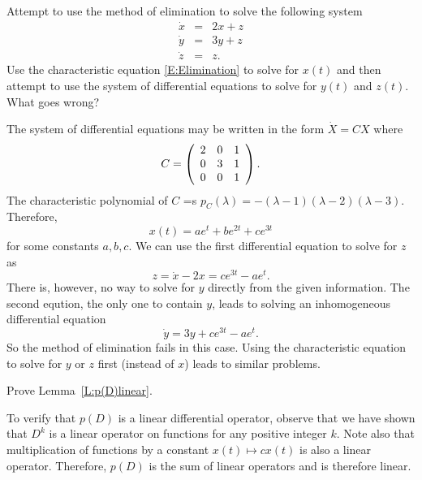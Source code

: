 \documentclass{ximera}
\begin{document}
\begin{exercise}  \label{c12.3.2}
Attempt to use the method of elimination to solve the following system
\[
\begin{array}{rcl}
\dot{x} & = & 2x + z\\
\dot{y} & = & 3y + z\\
\dot{z} & = & z.
\end{array}
\]
Use the characteristic equation \eqref{E:Elimination} to solve for $x(t)$ and 
then attempt to use the system of differential equations to solve for $y(t)$ 
and $z(t)$.  What goes wrong?

\begin{solution}

The system of differential equations may be written in the form $\dot{X}=CX$ where
\[
C=\left(\begin{array}{rrr} 2 & 0 & 1 \\ 0 & 3 & 1 \\ 0 & 0 & 1\end{array}\right).
\]
The characteristic polynomial of $C$ =s
$p_C(\lambda)=-(\lambda-1)(\lambda-2)(\lambda-3)$.  Therefore, 
\[
x(t) = ae^t+be^{2t}+ce^{3t}
\]
for some constants $a,b,c$.  We can use the first differential equation to solve for
$z$ as
\[
z = \dot{x}-2x = ce^{3t}-ae^t.
\]
There is, however, no way to solve for $y$ directly from the given information.  The
second eqution, the only one to contain $y$, leads to solving an inhomogeneous
differential equation
\[
\dot{y} = 3y + ce^{3t}-ae^t.
\]
So the method of elimination fails in this case.  Using the characteristic equation
to solve for $y$ or $z$ first (instead of $x$) leads to similar problems. 


\end{solution}
\end{exercise} 

\begin{exercise}  \label{c12.3.lem}
Prove Lemma~\ref{L:p(D)linear}.

\begin{solution}

To verify that $p(D)$ is a linear differential operator, observe that we have shown 
that $D^k$ is a linear operator on functions for any positive integer $k$.  Note also
that multiplication of functions by a constant $x(t)\mapsto cx(t)$ is also a linear
operator.  Therefore, $p(D)$ is the sum of linear operators and is therefore linear.


\end{solution}
\end{exercise}
\end{document}
